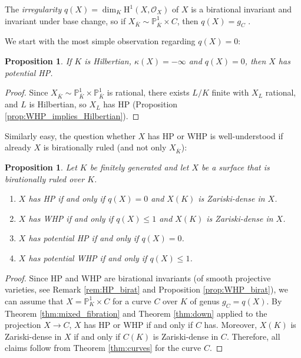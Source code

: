 \documentclass[10pt,a4paper]{amsart}
\theoremstyle{plain}
\newtheorem{proposition}[theorem]{Proposition}
\theoremstyle{remark}
\numberwithin{theorem}{section}
\begin{document}
The {\em irregularity} $q(X)=\dim_K \mathrm{H}^1(X,\mathcal{O}_X)$ of $X$ is a birational invariant \cite[Remark 6.4]{Badescu} and invariant under base change,
so if $X_{\overline{K}}\sim\mathbb{P}^1_{\overline{K}}\times C$,
then $q(X)=g_C$ \cite[Corollary V.2.5]{Hartshorne}.
 
We start with the most simple observation regarding $q(X)=0$:
\begin{proposition}
If $K$ is Hilbertian, $\kappa(X)=-\infty$ and $q(X)=0$, then $X$ has potential HP. 
\end{proposition}

\begin{proof}
Since $X_{\overline{K}}\sim\mathbb{P}^1_{\overline{K}}\times\mathbb{P}^1_{\overline{K}}$ is rational, there exists $L/K$ finite with $X_L$ rational, and $L$ is Hilbertian,
so $X_L$ has HP (Proposition \ref{prop:WHP_implies_Hilbertian}).    
\end{proof}

Similarly easy, the question whether $X$ has HP or WHP
is well-understood if already $X$ is birationally ruled (and not only $X_{\overline{K}}$):

\begin{proposition}\label{prop:uniruled}
    Let $K$ be finitely generated and let $X$ be a surface that is birationally ruled over $K$.
    \begin{enumerate}
        \item $X$ has HP if and only if $q(X)=0$ and $X(K)$ is Zariski-dense in $X$.
        \item $X$ has WHP if and only if $q(X)\leq 1$ and $X(K)$ is Zariski-dense in $X$.
        \item $X$ has potential HP if and only if $q(X)=0$.
        \item $X$ has potential WHP if and only if $q(X)\leq 1$.
    \end{enumerate}
\end{proposition}

\begin{proof}
Since HP and WHP are birational invariants (of smooth projective varieties, see Remark \ref{rem:HP_birat} and Proposition \ref{prop:WHP_birat}),
we can assume that $X=\mathbb{P}^1_K\times C$ for a curve $C$ over $K$ of genus $g_C=q(X)$.
By Theorem \ref{thm:mixed_fibration} and Theorem \ref{thm:down}
applied to the projection $X\rightarrow C$,
$X$ has HP or WHP if and only if $C$ has.
Moreover, $X(K)$ is Zariski-dense in $X$ if and only if $C(K)$ is Zariski-dense in $C$.
Therefore, all claims follow from Theorem \ref{thm:curves} for the curve $C$.
\end{proof}
\end{document}
